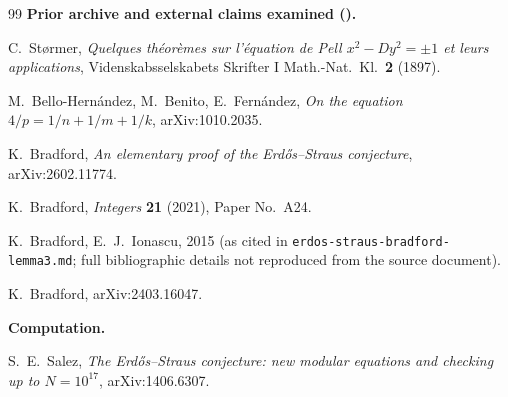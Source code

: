 \documentclass[11pt]{article}
\theoremstyle{plain}
\theoremstyle{definition}
\theoremstyle{remark}
\renewcommand{\_}{\textunderscore\allowbreak}
\begin{document}
\begin{thebibliography}{99}
\bigskip\noindent\textbf{Prior archive and external claims examined ().}

 C.~St\o rmer, \emph{Quelques th\'eor\`emes sur l'\'equation de Pell
$x^2-Dy^2=\pm1$ et leurs applications}, Videnskabsselskabets Skrifter I Math.-Nat.\ Kl.\
\textbf{2} (1897).

 M.~Bello-Hern\'andez, M.~Benito, E.~Fern\'andez, \emph{On the
equation $4/p=1/n+1/m+1/k$}, arXiv:1010.2035.

 K.~Bradford, \emph{An elementary proof of the Erd\H{o}s--Straus
conjecture}, arXiv:2602.11774.

 K.~Bradford, \emph{Integers} \textbf{21} (2021), Paper No.~A24.

 K.~Bradford, E.~J.~Ionascu, 2015 (as cited in
\texttt{erdos-\allowbreak straus-\allowbreak bradford-\allowbreak lemma3.md}; full bibliographic
details not reproduced from the source document).

 K.~Bradford, arXiv:2403.16047.

\bigskip\noindent\textbf{Computation.}

 S.~E.~Salez, \emph{The Erd\H{o}s--Straus conjecture: new modular equations
and checking up to $N=10^{17}$}, arXiv:1406.6307.

\end{thebibliography}
\end{document}
